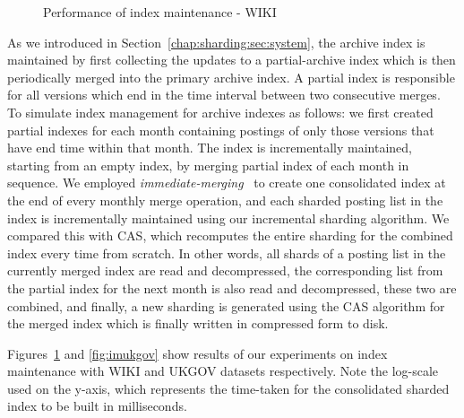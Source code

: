 \begin{figure}[!htb]
  \caption{Performance of index maintenance - WIKI}
  \label{fig:imwiki}
\end{figure}

As we introduced in Section~\ref{chap:sharding:sec:system}, the archive index is maintained by first collecting the updates to a partial-archive index which is then periodically merged into the primary archive index. A partial index is responsible for all versions which end in the time interval between two consecutive merges. To simulate index management for archive indexes as follows: we first created partial indexes for each month containing postings of only those versions that have end time within that month. The index is incrementally maintained, starting from an empty
index, by merging partial index of each month in sequence. We employed
\emph{immediate-merging}~\cite{Buttcher:2010fk} to create one
consolidated index at the end of every monthly merge operation, and
each sharded posting list in the index is incrementally maintained
using our incremental sharding algorithm. We compared this with CAS, which
recomputes the entire sharding for the combined index every time from
scratch. In other words, all shards of a posting list in the currently
merged index are read and decompressed, the corresponding list from
the partial index for the next month is also read and decompressed,
these two are combined, and finally, a new sharding is generated using
the CAS algorithm for the merged index which is finally written in compressed
form to disk.

Figures~\ref{fig:imwiki} and \ref{fig:imukgov} show results of our
experiments on index maintenance with WIKI and UKGOV datasets
respectively. Note the log-scale used on the y-axis,
which represents the time-taken for the consolidated sharded index to
be built in milliseconds. 

